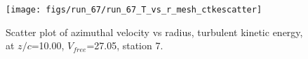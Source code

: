 \begin{figure}[H]
\centering
\texttt{[image: figs/run\_67/run\_67\_T\_vs\_r\_mesh\_ctkescatter]}
\caption{Scatter plot of azimuthal velocity vs radius, turbulent kinetic energy, at $z/c$=10.00, $V_{free}$=27.05, station 7.}
\end{figure}


